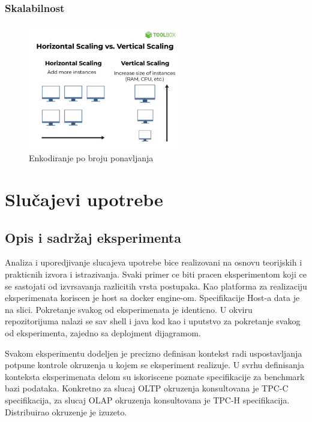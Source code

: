 \documentclass[12pt,oneside]{memoir}
\begin{document}
\subsection{Skalabilnost}

\begin{figure}[!ht]
  \centering
  \includegraphics[width=0.6\textwidth]{horizontal-vertical-scaling.jpg}
  \caption{Enkodiranje po broju ponavljanja}
  \label{fig:grafikon}
\end{figure}

\chapter{Slučajevi upotrebe}
\section{Opis i sadržaj eksperimenta}
Analiza i uporedjivanje slucajeva upotrebe bice realizovani na osnovu teorijskih i prakticnih  izvora i istrazivanja. Svaki primer ce biti pracen eksperimentom koji ce se sastojati od izvrsavanja razlicitih vrsta postupaka. Kao platforma za realizaciju eksperimenata koriscen je host sa docker engine-om. Specifikacije Host-a data je na slici. Pokretanje svakog od eksperimenata je identicno. U okviru repozitorijuma nalazi se sav shell i java kod kao i uputstvo za pokretanje svakog od eksperimenta, zajedno sa deplojment dijagramom.

Svakom eksperimentu dodeljen je precizno definisan kontekst radi uspostavljanja potpune kontrole okruzenja u kojem se eksperiment realizuje. U svrhu definisanja konteksta eksperimenata delom su iskoriscene poznate specifikacije za benchmark bazi podataka. Konkretno za slucaj OLTP okruzenja konsultovana je TPC-C specifikacija, za slucaj OLAP okruzenja konsultovana je TPC-H specifikacija. Distribuirao okruzenje je izuzeto.
\end{document}
